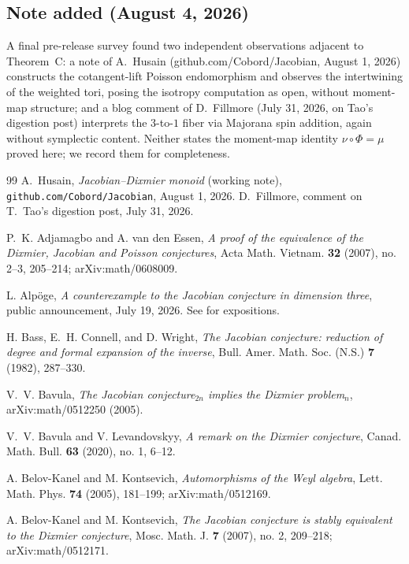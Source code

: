 \documentclass[11pt]{amsart}
\theoremstyle{plain}
\theoremstyle{definition}
\theoremstyle{remark}
\begin{document}
\subsection*{Note added (August 4, 2026)}
A final pre-release survey found two independent observations adjacent to Theorem~C:
a note of A.~Husain (github.com/Cobord/Jacobian, August 1, 2026) constructs the
cotangent-lift Poisson endomorphism and observes the intertwining of the weighted tori,
posing the isotropy computation as open, without moment-map structure; and a blog comment
of D.~Fillmore (July 31, 2026, on Tao's digestion post) interprets the $3$-to-$1$ fiber
via Majorana spin addition, again without symplectic content. Neither states the
moment-map identity $\nu\circ\Phi=\mu$ proved here; we record them for completeness.

\begin{thebibliography}{99}
 A.~Husain, \emph{Jacobian--Dixmier monoid} (working note), \texttt{github.com/Cobord/Jacobian}, August 1, 2026.
 D.~Fillmore, comment on T.~Tao's digestion post, July 31, 2026.


P.~K. Adjamagbo and A. van den Essen,
\emph{A proof of the equivalence of the Dixmier, Jacobian and Poisson
conjectures},
Acta Math. Vietnam. \textbf{32} (2007), no. 2--3, 205--214;
arXiv:math/0608009.

L. Alp\"oge,
\emph{A counterexample to the Jacobian conjecture in dimension three},
public announcement, July 19, 2026. See \cite{Tao26, Speyer26} for
expositions.

H. Bass, E.~H. Connell, and D. Wright,
\emph{The Jacobian conjecture: reduction of degree and formal expansion
of the inverse},
Bull. Amer. Math. Soc. (N.S.) \textbf{7} (1982), 287--330.

V.~V. Bavula,
\emph{The Jacobian conjecture${}_{2n}$ implies the Dixmier
problem${}_{n}$},
arXiv:math/0512250 (2005).

V.~V. Bavula and V. Levandovskyy,
\emph{A remark on the Dixmier conjecture},
Canad. Math. Bull. \textbf{63} (2020), no. 1, 6--12.

A. Belov-Kanel and M. Kontsevich,
\emph{Automorphisms of the Weyl algebra},
Lett. Math. Phys. \textbf{74} (2005), 181--199;
arXiv:math/0512169.

A. Belov-Kanel and M. Kontsevich,
\emph{The Jacobian conjecture is stably equivalent to the Dixmier
conjecture},
Mosc. Math. J. \textbf{7} (2007), no. 2, 209--218;
arXiv:math/0512171.


\end{thebibliography}
\end{document}
